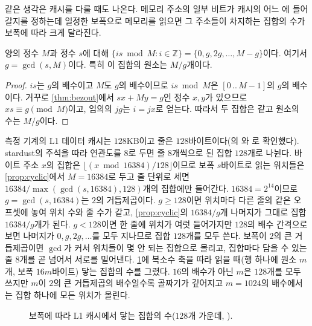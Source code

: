 같은 생각은 캐시를 다룰 때도 나온다. 메모리 주소의 일부 비트가 캐시의 어느 에 들어갈지를 정하는데 일정한 보폭으로 메모리를 읽으면 그 주소들이 차지하는 집합의 수가 보폭에 따라 크게 달라진다.

\begin{proposition}
\label{prop:cyclic}
양의 정수 $M$과 정수 $s$에 대해 $\{is\bmod M:i\in\mathbb{Z}\}=\{0,g,2g,\dots,M-g\}$이다. 여기서 $g=\gcd(s,M)$이다. 특히 이 집합의 원소는 $M/g$개이다.
\end{proposition}

\begin{proof}
$is$는 $g$의 배수이고 $M$도 $g$의 배수이므로 $is\bmod M$은 $[0\,..\,M-1]$의 $g$의 배수이다. 거꾸로 \cref{thm:bezout}에서 $sx+My=g$인 정수 $x,y$가 있으므로 $xs\equiv g\pmod M$이고, 임의의 $jg$는 $i=jx$로 얻는다. 따라서 두 집합은 같고 원소의 수는 $M/g$이다.
\end{proof}

측정 기계의 L1 데이터 캐시는 $128$KB이고 줄은 $128$바이트이다(의 와 로 확인했다). stardust의 주석을 따라 연관도를 $8$로 두면 줄 $8$개씩으로 된 집합 $128$개로 나뉜다. 바이트 주소 $x$의 집합은 $\lfloor(x\bmod16384)/128\rfloor$이므로 보폭 $s$바이트로 읽는 위치들은 \cref{prop:cyclic}에서 $M=16384$로 두고 줄 단위로 세면 $16384/\max(\gcd(s,16384),128)$개의 집합에만 들어간다. $16384=2^{14}$이므로 $g=\gcd(s,16384)$는 $2$의 거듭제곱이다. $g\ge128$이면 위치마다 다른 줄의 같은 오프셋에 놓여 위치 수와 줄 수가 같고, \cref{prop:cyclic}의 $16384/g$개 나머지가 그대로 집합 $16384/g$개가 된다. $g<128$이면 한 줄에 위치가 여럿 들어가지만 $128$의 배수 간격으로 보면 나머지가 $0,g,2g,\dots$를 모두 지나므로 집합 $128$개를 모두 쓴다. 보폭이 $2$의 큰 거듭제곱이면 $\gcd$가 커서 위치들이 몇 안 되는 집합으로 몰리고, 집합마다 담을 수 있는 줄 $8$개를 곧 넘어서 서로를 밀어낸다. \cref{fig:cache-sets}에 복소수 축을 따라 읽을 때(행 하나에 원소 $m$개, 보폭 $16m$바이트) 닿는 집합의 수를 그렸다. $16$의 배수가 아닌 $m$은 $128$개를 모두 쓰지만 $m$이 $2$의 큰 거듭제곱의 배수일수록 골짜기가 깊어지고 $m=1024$의 배수에서는 집합 하나에 모든 위치가 몰린다.

\begin{figure}[htbp]
\centering
{}
\caption{보폭에 따라 L1 캐시에서 닿는 집합의 수($128$개 가운데, ).}
\label{fig:cache-sets}
\end{figure}

